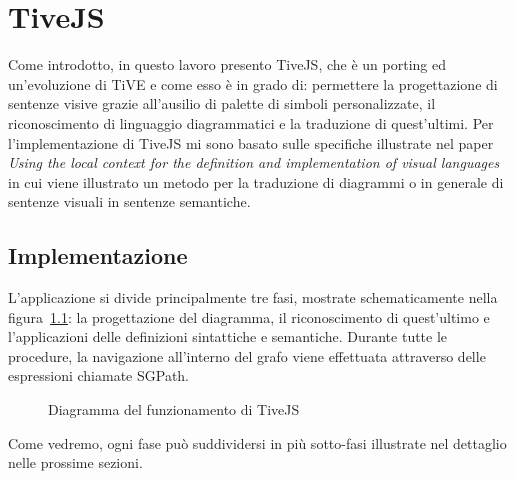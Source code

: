 ﻿\chapter{TiveJS}
    Come introdotto, in questo lavoro presento TiveJS, che è un porting ed un'evoluzione di TiVE e come esso è in grado di: permettere la progettazione di sentenze visive grazie all'ausilio di palette di simboli personalizzate, il riconoscimento di linguaggio diagrammatici e la traduzione di quest'ultimi.
    \newline
    Per l'implementazione di TiveJS mi sono basato sulle specifiche illustrate nel paper \textit{Using the local context for the definition and implementation of visual languages}~\cite{localcontext} in cui viene illustrato un metodo per la traduzione di diagrammi o in generale di sentenze visuali in sentenze semantiche.

    \section{Implementazione}
        L'applicazione si divide principalmente tre fasi, mostrate schematicamente nella figura~\ref{fig:funzionamento}: la progettazione del diagramma, il riconoscimento di quest'ultimo e l'applicazioni delle definizioni sintattiche e semantiche. Durante tutte le procedure, la navigazione all'interno del grafo viene effettuata attraverso delle espressioni chiamate SGPath.
        \newline
        \begin{figure}[htbp]
            \centering
            \caption{Diagramma del funzionamento di TiveJS}
            \label{fig:funzionamento}
        \end{figure}

        Come vedremo, ogni fase può suddividersi in più sotto-fasi illustrate nel dettaglio nelle prossime sezioni.

